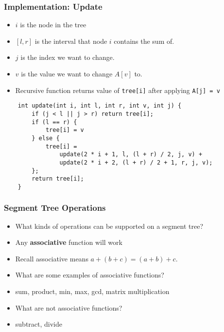 \documentclass[t,handout]{beamer}
\begin{document}
\begin{frame}[fragile]
\frametitle{Implementation: Update}
\begin{itemize}
    \item $i$ is the node in the tree
    \item $[l, r]$ is the interval that node $i$ contains the sum of.
    \item $j$ is the index we want to change.
    \item $v$ is the value we want to change $A[v]$ to.
    \item Recursive function returns value of \texttt{tree[i]} after applying \texttt{A[j] = v}
\end{itemize}
\begin{verbatim}
    int update(int i, int l, int r, int v, int j) {
        if (j < l || j > r) return tree[i];
        if (l == r) {
            tree[i] = v
        } else {
            tree[i] =
                update(2 * i + 1, l, (l + r) / 2, j, v) +
                update(2 * i + 2, (l + r) / 2 + 1, r, j, v);
        };
        return tree[i];
    }
\end{verbatim}
\end{frame}

\begin{frame}
    \frametitle{Segment Tree Operations}
    
    \begin{itemize}
        \item What kinds of operations can be supported on a segment tree?
        
        \pause
        
        \item Any \textbf{associative} function will work
        
        \item Recall associative means $a + (b + c) = (a + b) + c$.
        
        \pause
        
        \item What are some examples of associative functions?
        
        \pause
        
        \item sum, product, min, max, gcd, matrix multiplication
        
        \pause
        
        \item What are not associative functions?
        
        \pause
        
        \item subtract, divide
    \end{itemize}
\end{frame}
\end{document}
